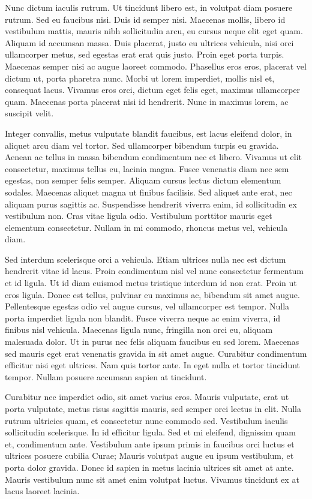 \documentclass[book,A4paper,10pt,twoside,oldfontcommands]{memoir}\usepackage[]{graphicx}\usepackage[usenames,dvipsnames]{color}
\begin{document}
Nunc dictum iaculis rutrum. Ut tincidunt libero est, in volutpat diam
posuere rutrum. Sed eu faucibus nisi. Duis id semper nisi. Maecenas
mollis, libero id vestibulum mattis, mauris nibh sollicitudin arcu, eu
cursus neque elit eget quam. Aliquam id accumsan massa. Duis placerat,
justo eu ultrices vehicula, nisi orci ullamcorper metus, sed egestas
erat erat quis justo. Proin eget porta turpis. Maecenas semper nisi ac
augue laoreet commodo. Phasellus eros eros, placerat vel dictum ut,
porta pharetra nunc. Morbi ut lorem imperdiet, mollis nisl et,
consequat lacus. Vivamus eros orci, dictum eget felis eget, maximus
ullamcorper quam. Maecenas porta placerat nisi id hendrerit. Nunc in
maximus lorem, ac suscipit velit. 

Integer convallis, metus vulputate blandit faucibus, est lacus
eleifend dolor, in aliquet arcu diam vel tortor. Sed ullamcorper
bibendum turpis eu gravida. Aenean ac tellus in massa bibendum
condimentum nec et libero. Vivamus ut elit consectetur, maximus tellus
eu, lacinia magna. Fusce venenatis diam nec sem egestas, non semper
felis semper. Aliquam cursus lectus dictum elementum sodales. Maecenas
aliquet magna ut finibus facilisis. Sed aliquet ante erat, nec aliquam
purus sagittis ac. Suspendisse hendrerit viverra enim, id sollicitudin
ex vestibulum non. Cras vitae ligula odio. Vestibulum porttitor mauris
eget elementum consectetur. Nullam in mi commodo, rhoncus metus vel,
vehicula diam. 

Sed interdum scelerisque orci a vehicula. Etiam ultrices nulla nec est
dictum hendrerit vitae id lacus. Proin condimentum nisl vel nunc
consectetur fermentum et id ligula. Ut id diam euismod metus tristique
interdum id non erat. Proin ut eros ligula. Donec est tellus, pulvinar
eu maximus ac, bibendum sit amet augue. Pellentesque egestas odio vel
augue cursus, vel ullamcorper est tempor. Nulla porta imperdiet ligula
non blandit. Fusce viverra neque ac enim viverra, id finibus nisl
vehicula. Maecenas ligula nunc, fringilla non orci eu, aliquam
malesuada dolor. Ut in purus nec felis aliquam faucibus eu sed lorem.
Maecenas sed mauris eget erat venenatis gravida in sit amet augue.
Curabitur condimentum efficitur nisi eget ultrices. Nam quis tortor
ante. In eget nulla et tortor tincidunt tempor. Nullam posuere
accumsan sapien at tincidunt. 

Curabitur nec imperdiet odio, sit amet varius eros. Mauris vulputate,
erat ut porta vulputate, metus risus sagittis mauris, sed semper orci
lectus in elit. Nulla rutrum ultricies quam, et consectetur nunc
commodo sed. Vestibulum iaculis sollicitudin scelerisque. In id
efficitur ligula. Sed et mi eleifend, dignissim quam et, condimentum
ante. Vestibulum ante ipsum primis in faucibus orci luctus et ultrices
posuere cubilia Curae; Mauris volutpat augue eu ipsum vestibulum, et
porta dolor gravida. Donec id sapien in metus lacinia ultrices sit
amet at ante. Mauris vestibulum nunc sit amet enim volutpat luctus.
Vivamus tincidunt ex at lacus laoreet lacinia. 
\end{document}
